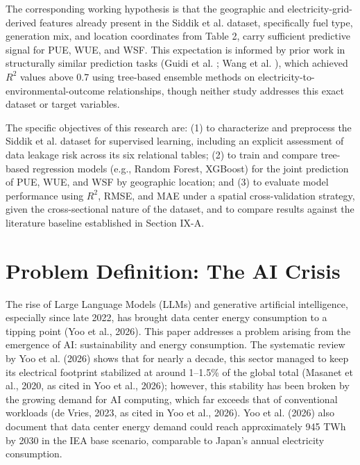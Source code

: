 \documentclass[conference]{IEEEtran}
\begin{document}
The corresponding working hypothesis is that the geographic and electricity-grid-derived features already present in the Siddik et al. dataset, specifically fuel type, generation mix, and location coordinates from Table 2, carry sufficient predictive signal for PUE, WUE, and WSF. This expectation is informed by prior work in structurally similar prediction tasks (Guidi et al. \cite{Guidi2024}; Wang et al. \cite{Wang2025XGBoost}), which achieved $R^2$ values above 0.7 using tree-based ensemble methods on electricity-to-environmental-outcome relationships, though neither study addresses this exact dataset or target variables.

The specific objectives of this research are: (1) to characterize and preprocess the Siddik et al. dataset for supervised learning, including an explicit assessment of data leakage risk across its six relational tables; (2) to train and compare tree-based regression models (e.g., Random Forest, XGBoost) for the joint prediction of PUE, WUE, and WSF by geographic location; and (3) to evaluate model performance using $R^2$, RMSE, and MAE under a spatial cross-validation strategy, given the cross-sectional nature of the dataset, and to compare results against the literature baseline established in Section IX-A.

\section{Problem Definition: The AI Crisis}

The rise of Large Language Models (LLMs) and generative artificial intelligence, especially since late 2022, has brought data center energy consumption to a tipping point (Yoo et al., 2026). This paper addresses a problem arising from the emergence of AI: sustainability and energy consumption. The systematic review by Yoo et al. (2026) shows that for nearly a decade, this sector managed to keep its electrical footprint stabilized at around 1–1.5\% of the global total (Masanet et al., 2020, as cited in Yoo et al., 2026); however, this stability has been broken by the growing demand for AI computing, which far exceeds that of conventional workloads (de Vries, 2023, as cited in Yoo et al., 2026). Yoo et al. (2026) also document that data center energy demand could reach approximately 945 TWh by 2030 in the IEA base scenario, comparable to Japan's annual electricity consumption.
\end{document}
